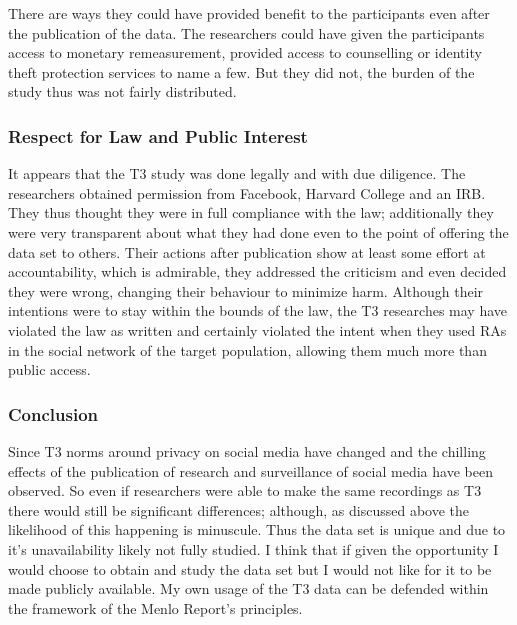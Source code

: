 \documentclass[10pt,a4paper,twocolumn]{article}
\begin{document}
There are ways they could have provided benefit to the participants even after the publication of the data. The researchers could have given the participants access to monetary remeasurement, provided access to counselling or identity theft protection services to name a few. But they did not, the burden of the study thus was not fairly distributed.

\subsubsection*{Respect for Law and Public Interest}

It appears that the T3 study was done legally and with due diligence. The researchers obtained permission from Facebook,  Harvard College and an IRB\cite{t3}. They thus thought they were in full compliance with the law; additionally they were very transparent about what they had done even to the point of offering the data set to others. Their actions after publication show at least some effort at accountability, which is admirable, they addressed the criticism\cite{zimmerblogcomment} and even decided they were wrong, changing their behaviour to minimize harm. Although their intentions were to stay within the bounds of the law, the T3 researches may have violated the law as written and certainly violated the intent when they used RAs in the social network of the target population, allowing them much more than public access.

\subsubsection*{Conclusion}

Since T3 norms around privacy on social media have changed and the chilling effects of the publication of research and surveillance of social media\cite{chillingeffects} have been observed. So even if researchers were able to make the same recordings as T3 there would still be significant differences; although, as discussed above the likelihood of this happening is minuscule. Thus the data set is unique and due to it's unavailability\cite{t3site} likely not fully studied. I think that if given the opportunity I would choose to obtain and study the data set but I would not like for it to be made publicly available. My own usage of the T3 data can be defended within the framework of the Menlo Report's principles.\par
\end{document}
